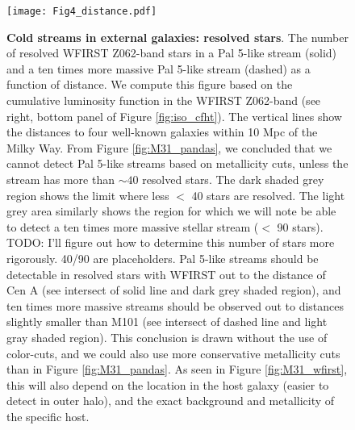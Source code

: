 \documentclass[twocolumn]{aastex62}
\newcommand{\todo}[1]{{\color{red} TODO: #1}}
\begin{document}



\begin{figure}
\centerline{\texttt{[image: Fig4\_distance.pdf]}}
\caption{{\bf Cold streams in external galaxies: resolved stars}. The number of resolved WFIRST Z062-band stars in a Pal 5-like stream (solid) and a ten times more massive Pal 5-like stream (dashed) as a function of distance. We compute this figure based on the cumulative luminosity function in the WFIRST Z062-band (see right, bottom panel of Figure \ref{fig:iso_cfht}). The vertical lines show the distances to four well-known galaxies within 10 Mpc of the Milky Way. From Figure \ref{fig:M31_pandas}, we concluded that we cannot detect Pal 5-like streams based on metallicity cuts, unless the stream has more than $\sim 40$ resolved stars. The dark shaded grey region shows the limit where less $<$ 40 stars are resolved. The light grey area similarly shows the region for which we will note be able to detect a ten times more massive stellar stream ($<$ 90 stars). \todo{I'll figure out how to determine this number of stars more rigorously. 40/90 are placeholders}.
Pal 5-like streams should be detectable in resolved stars with WFIRST out to the distance of Cen A (see intersect of solid line and dark grey shaded region), and ten times more massive streams should be observed out to distances slightly smaller than M101 (see intersect of dashed line and light gray shaded region). This conclusion is drawn without the use of color-cuts, and we could also use more conservative metallicity cuts than in Figure \ref{fig:M31_pandas}. As seen in Figure \ref{fig:M31_wfirst}, this will also depend on the location in the host galaxy (easier to detect in outer halo), and the exact background and metallicity of the specific host.}
\label{fig:distance}
\end{figure}
\end{document}
